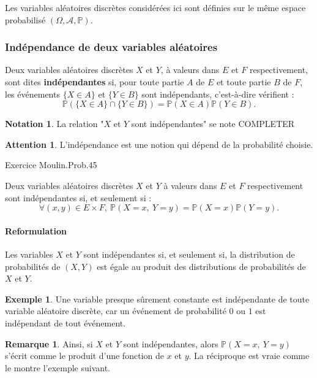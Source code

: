 \documentclass[french]{article}
\renewcommand{\P}{\mathbb{P}}
\theoremstyle{plain}
\theoremstyle{definition}
\newtheorem*{ex}{Exemple}
\newtheorem*{rmq}{Remarque}
\newtheorem*{notation}{Notation}
\newtheorem*{attention}{Attention}
\theoremstyle{remark}
\begin{document}
Les variables aléatoires discrètes considérées ici sont définies sur le même espace probabilisé $(\Omega,\mathcal{A},\P)$.

\subsubsection*{Indépendance de deux variables aléatoires}

\begin{dfn}
	Deux variables aléatoires discrètes $X$ et $Y$, à valeurs dans $E$ et $F$ respectivement, sont dites \textbf{indépendantes} si, pour toute partie $A$ de $E$ et toute partie $B$ de $F$, les événements $\{X\in A\}$ et $\{Y\in B\}$ sont indépendants, c'est-à-dire vérifient :
	$$\P(\{X\in A\}\cap\{Y\in B\})=\P(X\in A)\P(Y\in B).$$
\end{dfn}

\begin{notation}
	La relation "$X$ et $Y$ sont indépendantes" se note COMPLETER
\end{notation}

\begin{attention}
	L'indépendance est une notion qui dépend de la probabilité choisie.
\end{attention}

Exercice Moulin.Prob.45

\begin{thm}{}%
	Deux variables aléatoires discrètes $X$ et $Y$ à valeurs dans $E$ et $F$ respectivement sont indépendantes si, et seulement si : $$\forall (x,y)\in E\times F,\ \P(X=x,\ Y=y)=\P(X=x)\P(Y=y).$$
\end{thm}

\paragraph{Reformulation}
Les variables $X$ et $Y$ sont indépendantes si, et seulement si, la distribution de probabilités de $(X,Y)$ est égale au produit des distributions de probabilités de $X$ et $Y$.

\begin{ex}
	Une variable presque sûrement constante est indépendante de toute variable aléatoire discrète, car un événement de probabilité $0$ ou $1$ est indépendant de tout événement.
\end{ex}

\begin{rmq}
	Ainsi, si $X$ et $Y$ sont indépendantes, alors $\P(X=x,\ Y=y)$ s'écrit comme le produit d'une fonction de $x$ et $y$. La réciproque est vraie comme le montre l'exemple suivant.
\end{rmq}
\end{document}
